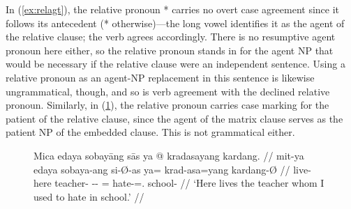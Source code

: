 In (\ref{ex:relagt}), the relative pronoun * carries no
overt case agreement since it follows its antecedent (*
otherwise)---the long vowel identifies it as the agent of the relative clause;
the verb agrees accordingly. There is no resumptive agent pronoun here either,
so the relative pronoun stands in for the agent NP that would be necessary if
the relative clause were an independent sentence. Using a relative pronoun as
an agent-NP replacement in this sentence is likewise ungrammatical, though, and
so is verb agreement with the declined relative pronoun. Similarly, in
(\ref{ex:relpat}), the relative pronoun carries case marking for the patient of
the relative clause, since the agent of the matrix clause serves as the patient
NP of the embedded clause. This is not grammatical either.

\begin{figure}
\ex\label{ex:relpat}
\ljudge* \begingl
	\gla Mica edaya sobayāng sās ya @ kradasayang kardang. //
	\glb mit-ya edaya sobaya-ang si-Ø-as ya= krad-asa=yang kardang-Ø //
	\glc live-\TsgM{} here teacher-\Aarg{} \Rel{}-\Aarg{}-\Parg{} \LocT{}=
		hate-\Hab{}=\Fsg{}.\Aarg{} school-\Top{} //
% 
	\glft `Here lives the teacher whom I used to hate in school.' //
\endgl
\xe
\end{figure}

